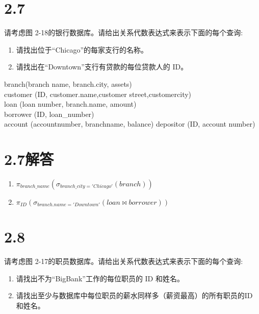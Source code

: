 \documentclass{article}
\begin{document}
    \section*{2.7}
    
    请考虑图 2-18的银行数据库。请给出关系代数表达式来表示下面的每个查询:
    \begin{enumerate}
    	\item 请找出位于“Chicago”的每家支行的名称。
    	\item 请找出在“Downtown”支行有贷款的每位贷款人的 ID。
    \end{enumerate}
    
    \begin{tcolorbox}[title = {2-18的银行数据库}, colback = blue!25!white, colframe = blue!75!black]
    	branch(branch name, branch.city, assets)\\
    	customer (ID, customer.name,customer street,customercity) \\
    	loan (loan number, branch.name, amount) \\
    	borrower (ID, loan\_number)\\
    	account (accountnumber, branchname, balance) depositor (ID, account number)
    \end{tcolorbox}
    
    \section*{2.7解答}
    
    \begin{enumerate}[noitemsep, label={{\arabic*})}]
    	\item $\pi_{branch\_name}(\sigma_{branch\_city = 'Chicago'}(branch))$
    	\item $\pi_{ID} (\sigma_{branch.name = 'Downtown'}(loan \bowtie borrower))$
    \end{enumerate}\textbf{}
	
	\section*{2.8}
	
	请考虑图 2-17的职员数据库。请给出关系代数表达式来表示下面的每个查询:
	
	\begin{enumerate}
		\item 请找出不为“BigBank”工作的每位职员的 ID 和姓名。
		\item 请找出至少与数据库中每位职员的薪水同样多（薪资最高）的所有职员的ID 和姓名。
	\end{enumerate}
	
\end{document}
